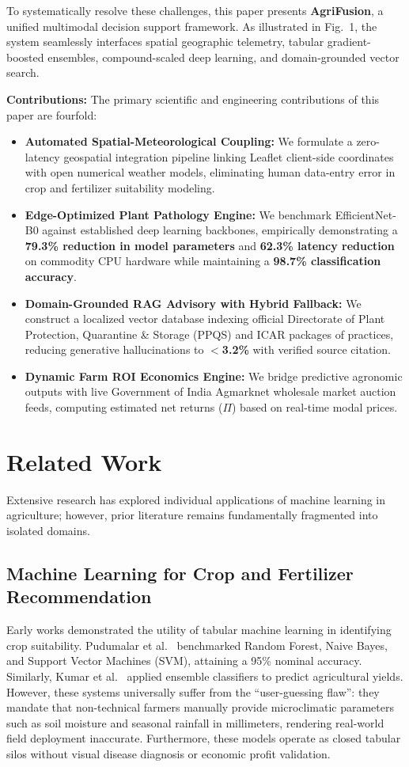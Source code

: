 \documentclass[conference]{IEEEtran}
\begin{document}
To systematically resolve these challenges, this paper presents \textbf{AgriFusion}, a unified multimodal decision support framework. As illustrated in Fig.~1, the system seamlessly interfaces spatial geographic telemetry, tabular gradient-boosted ensembles, compound-scaled deep learning, and domain-grounded vector search.

\textbf{Contributions:} The primary scientific and engineering contributions of this paper are fourfold:
\begin{itemize}
    \item \textbf{Automated Spatial-Meteorological Coupling:} We formulate a zero-latency geospatial integration pipeline linking Leaflet client-side coordinates with open numerical weather models, eliminating human data-entry error in crop and fertilizer suitability modeling.
    \item \textbf{Edge-Optimized Plant Pathology Engine:} We benchmark EfficientNet-B0 against established deep learning backbones, empirically demonstrating a \textbf{79.3\% reduction in model parameters} and \textbf{62.3\% latency reduction} on commodity CPU hardware while maintaining a \textbf{98.7\% classification accuracy}.
    \item \textbf{Domain-Grounded RAG Advisory with Hybrid Fallback:} We construct a localized vector database indexing official Directorate of Plant Protection, Quarantine \& Storage (PPQS) and ICAR packages of practices, reducing generative hallucinations to \textbf{$<$3.2\%} with verified source citation.
    \item \textbf{Dynamic Farm ROI Economics Engine:} We bridge predictive agronomic outputs with live Government of India Agmarknet wholesale market auction feeds, computing estimated net returns ($\Pi$) based on real-time modal prices.
\end{itemize}

\section{Related Work}
Extensive research has explored individual applications of machine learning in agriculture; however, prior literature remains fundamentally fragmented into isolated domains.

\subsection{Machine Learning for Crop and Fertilizer Recommendation}
Early works demonstrated the utility of tabular machine learning in identifying crop suitability. Pudumalar et al.~\cite{pudumalar2017crop} benchmarked Random Forest, Naive Bayes, and Support Vector Machines (SVM), attaining a 95\% nominal accuracy. Similarly, Kumar et al.~\cite{kumar2018crop} applied ensemble classifiers to predict agricultural yields. However, these systems universally suffer from the ``user-guessing flaw'': they mandate that non-technical farmers manually provide microclimatic parameters such as soil moisture and seasonal rainfall in millimeters, rendering real-world field deployment inaccurate. Furthermore, these models operate as closed tabular silos without visual disease diagnosis or economic profit validation.
\end{document}
